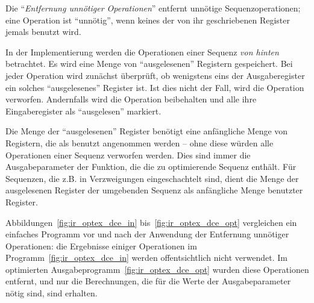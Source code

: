 \documentclass[twoside,a4paper,fleqn,12pt]{book}
\begin{document}
Die "`\emph{Entfernung unnötiger Operationen}"' entfernt unnötige Sequenzoperationen; eine Operation ist "`unnötig"',
wenn keines der von ihr geschriebenen Register jemals benutzt wird.


In der Implementierung werden die Operationen einer Sequenz \emph{von hinten} betrachtet.
Es wird eine Menge von "`ausgelesenen"' Registern gespeichert. Bei jeder Operation wird
zunächst überprüft, ob wenigstens eins der Ausgaberegister ein solches "`ausgelesenes"'
Register ist. Ist dies nicht der Fall, wird die Operation verworfen. Andernfalls wird
die Operation beibehalten und alle ihre Eingaberegister als "`ausgelesen"' markiert.

Die Menge der "`ausgelesenen"' Register benötigt eine anfängliche Menge von Registern, die als
benutzt angenommen werden  -- ohne diese würden alle Operationen einer Sequenz verworfen
werden. Dies sind immer die Ausgabeparameter der Funktion, die die zu optimierende Sequenz enthält.
Für Sequenzen, die z.B. in Verzweigungen eingeschachtelt sind, dient die Menge der
ausgelesenen Register der umgebenden Sequenz als anfängliche Menge benutzter Register.


Abbildungen~\ref{fig:ir_optex_dce_in} bis~\ref{fig:ir_optex_dce_opt} vergleichen ein einfaches Programm vor und nach der Anwendung der Entfernung unnötiger Operationen:
die Ergebnisse einiger Operationen im Programm~\ref{fig:ir_optex_dce_in} werden offentsichtlich nicht verwendet.
Im optimierten Ausgabeprogramm~\ref{fig:ir_optex_dce_opt} wurden diese Operationen entfernt, und nur die Berechnungen,
die für die Werte der Ausgabeparameter nötig sind, sind erhalten.

\end{document}
